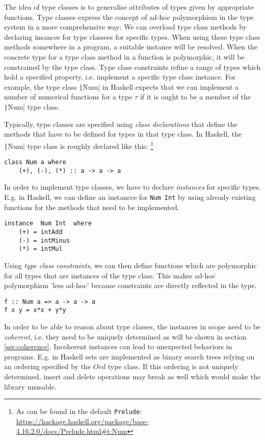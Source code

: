 The idea of type classes is to generalise attributes of types given by appropriate functions.
Type classes express the concept of ad-hoc polymorphism in the type system in a more comprehensive way:
We can overload type class methods by declaring insances for type classees for specific types.
When using these type class methods somewhere in a program, a suitable instance will be resolved.
When the concrete type for a type class method in a function is polymorphic, it will be constrained by the type class.
Type class constraints refine a range of types which hold a specified property, i.e. implement a specific type class instance.
For example, the type class \texttt|Num| in Haskell expects that we can implement a number of numerical functions for a type $\tau$ if it is ought to be a member of the \texttt|Num| type class.

Typically, type classes are specified using \emph{class declarations} that define the methods that have to be defined for types in that type class.
In Haskell, the \texttt|Num| type class is roughly declared like this:
\footnote{As can be found in the default \texttt{Prelude}: \url{https://hackage.haskell.org/package/base-4.16.2.0/docs/Prelude.html\#t:Num}}

\begin{verbatim}
class Num a where
    (+), (-), (*) :: a -> a -> a
\end{verbatim}

In order to implement type classes, we have to declare \emph{instances} for specific types.
E.g. in Haskell, we can define an instancce for \texttt{Num Int} by using already existing functions for the methods that need to be implemented.

\begin{verbatim}
instance  Num Int  where
    (+) = intAdd
    (-) = intMinus
    (*) = intMul
\end{verbatim}

Using \emph{type class constraints}, we can then define functions which are polymorphic for all types that are instances of the type class.
This makes ad-hoc polymorphism 'less ad-hoc' \cite{wadlerblott} because constraints are directly reflected in the type.

\begin{verbatim}
f :: Num a => a -> a -> a
f x y = x*x + y*y
\end{verbatim}


In order to be able to reason about type classes, the instances in scope need to be \emph{coherent}, i.e. they need to be uniquely determined as will be shown in section \ref{sec:coherence}.
Incoherent instances can lead to unexpected behaviors in programs.
E.g. in Haskell sets are implemented as binary search trees relying on an ordering specified by the $Ord$ type class.
If this ordering is not uniquely determined, insert and delete operations may break as well which would make the library unusable. \cite{Kilpatrick2019-cy}

